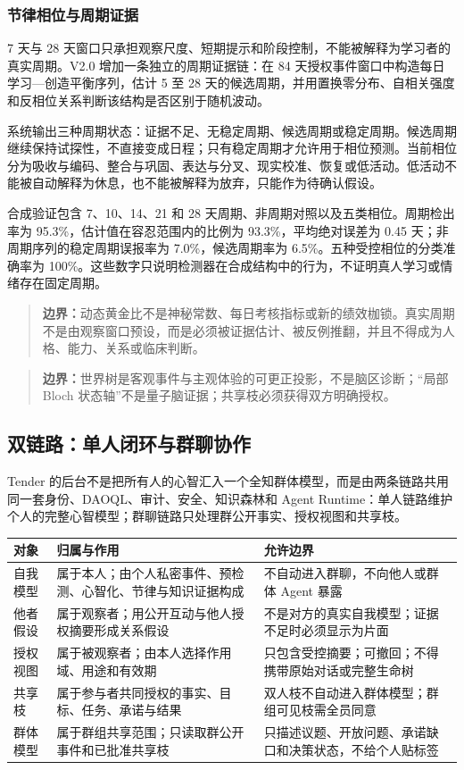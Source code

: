 \documentclass[UTF8,a4paper,11pt]{ctexart}
\newcommand{\boundary}[1]{\begin{quote}\noindent\textbf{\color{TenderPink}边界：}#1\end{quote}}
\begin{document}
\subsubsection{节律相位与周期证据}

7 天与 28 天窗口只承担观察尺度、短期提示和阶段控制，不能被解释为学习者的真实周期。V2.0 增加一条独立的周期证据链：在 84 天授权事件窗口中构造每日学习—创造平衡序列，估计 5 至 28 天的候选周期，并用置换零分布、自相关强度和反相位关系判断该结构是否区别于随机波动。

系统输出三种周期状态：证据不足、无稳定周期、候选周期或稳定周期。候选周期继续保持试探性，不直接变成日程；只有稳定周期才允许用于相位预测。当前相位分为吸收与编码、整合与巩固、表达与分叉、现实校准、恢复或低活动。低活动不能被自动解释为休息，也不能被解释为放弃，只能作为待确认假设。

合成验证包含 7、10、14、21 和 28 天周期、非周期对照以及五类相位。周期检出率为 95.3\%，估计值在容忍范围内的比例为 93.3\%，平均绝对误差为 0.45 天；非周期序列的稳定周期误报率为 7.0\%，候选周期率为 6.5\%。五种受控相位的分类准确率为 100\%。这些数字只说明检测器在合成结构中的行为，不证明真人学习或情绪存在固定周期。

\boundary{动态黄金比不是神秘常数、每日考核指标或新的绩效枷锁。真实周期不是由观察窗口预设，而是必须被证据估计、被反例推翻，并且不得成为人格、能力、关系或临床判断。}

\boundary{世界树是客观事件与主观体验的可更正投影，不是脑区诊断；“局部 Bloch 状态轴”不是量子脑证据；共享枝必须获得双方明确授权。}

\subsection{双链路：单人闭环与群聊协作}

Tender 的后台不是把所有人的心智汇入一个全知群体模型，而是由两条链路共用同一套身份、DAOQL、审计、安全、知识森林和 Agent Runtime：单人链路维护个人的完整心智模型；群聊链路只处理群公开事实、授权视图和共享枝。

\begin{center}
\begin{longtable}{@{}p{3.2cm}p{4.8cm}p{5.0cm}@{}}
\toprule
\textbf{对象} & \textbf{归属与作用} & \textbf{允许边界} \\
\midrule
自我模型 & 属于本人；由个人私密事件、预检测、心智化、节律与知识证据构成 & 不自动进入群聊，不向他人或群体 Agent 暴露 \\
他者假设 & 属于观察者；用公开互动与他人授权摘要形成关系假设 & 不是对方的真实自我模型；证据不足时必须显示为片面 \\
授权视图 & 属于被观察者；由本人选择作用域、用途和有效期 & 只包含受控摘要；可撤回；不得携带原始对话或完整生命树 \\
共享枝 & 属于参与者共同授权的事实、目标、任务、承诺与结果 & 双人枝不自动进入群体模型；群组可见枝需全员同意 \\
群体模型 & 属于群组共享范围；只读取群公开事件和已批准共享枝 & 只描述议题、开放问题、承诺缺口和决策状态，不给个人贴标签 \\
\bottomrule
\end{longtable}
\end{center}
\end{document}
